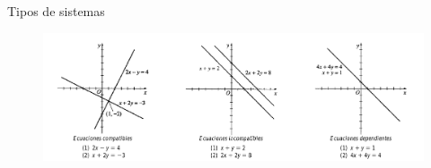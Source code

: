 {Tipos de sistemas}
	\begin{figure}
		\centering
		\includegraphics[width=12cm,keepaspectratio=true]{./precalculo/IM0402.png}
		\label{fig:0401}
	\end{figure}
	

